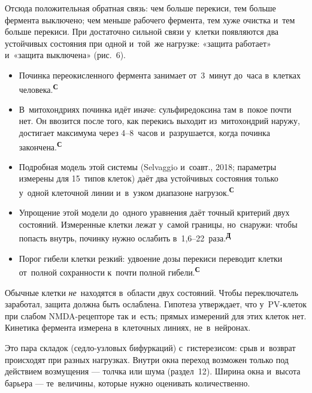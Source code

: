 \documentclass[11pt,a4paper,landscape,twocolumn]{article}
\newcommand{\tS}{\textsuperscript{\sffamily\bfseries\color{cB}С}}
\newcommand{\tD}{\textsuperscript{\sffamily\bfseries\color{cO}Д}}
\newcommand{\facts}{\par\vspace{3pt}{\sffamily\bfseries\small\color{cM}Опорные факты}\par\vspace{-2pt}}
\begin{document}
Отсюда положительная обратная связь: чем больше перекиси, тем больше фермента выключено; чем меньше рабочего фермента, тем хуже очистка и~тем больше перекиси. При достаточно сильной связи у~клетки появляются два устойчивых состояния при одной и~той~же нагрузке: «защита работает» и~«защита выключена» (рис.~6).
\facts
\begin{itemize}
\item Починка переокисленного фермента занимает от~3~минут до~часа в~клетках человека.\tS
\item В~митохондриях починка идёт иначе: сульфиредоксина там в~покое почти нет. Он ввозится после того, как перекись выходит из~митохондрий наружу, достигает максимума через 4–8~часов и~разрушается, когда починка закончена.\tS
\item Подробная модель этой системы (Selvaggio и~соавт., 2018; параметры измерены для 15~типов клеток) даёт два устойчивых состояния только у~одной клеточной линии и~в~узком диапазоне нагрузок.\tS
\item Упрощение этой модели до~одного уравнения даёт точный критерий двух состояний. Измеренные клетки лежат у~самой границы, но~снаружи: чтобы попасть внутрь, починку нужно ослабить в~1,6–22~раза.\tD
\item Порог гибели клетки резкий: удвоение дозы перекиси переводит клетки от~полной сохранности к~почти полной гибели.\tS
\end{itemize}
\begin{note}
Обычные клетки \emph{не}~находятся в~области двух состояний. Чтобы переключатель заработал, защита должна быть ослаблена. Гипотеза утверждает, что у~PV-клеток при слабом NMDA-рецепторе так и~есть; прямых измерений для этих клеток нет. Кинетика фермента измерена в~клеточных линиях, не~в~нейронах.
\end{note}
\begin{ineq}
Это пара складок (седло-узловых бифуркаций) с~гистерезисом: срыв и~возврат происходят при разных нагрузках. Внутри окна переход возможен только под действием возмущения — толчка или шума (раздел~12). Ширина окна и~высота барьера — те~величины, которые нужно оценивать количественно.
\end{ineq}

\end{document}

